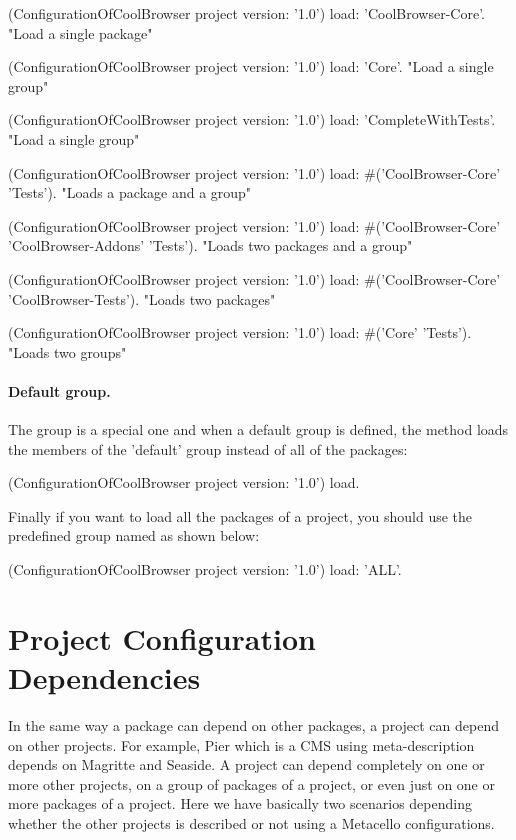 \documentclass[a4paper,10pt,twoside]{book}
\begin{document}
 
\begin{code}{}
(ConfigurationOfCoolBrowser project version: '1.0') load: 'CoolBrowser-Core'. 
	"Load a single package"

(ConfigurationOfCoolBrowser project version: '1.0') load: 'Core'. 
	"Load a single group"

(ConfigurationOfCoolBrowser project version: '1.0') load: 'CompleteWithTests'.  
	"Load a single group"
 
(ConfigurationOfCoolBrowser project version: '1.0') 
	load: #('CoolBrowser-Core' 'Tests').    
	"Loads a package and a group"

(ConfigurationOfCoolBrowser project version: '1.0') load: #('CoolBrowser-Core' 'CoolBrowser-Addons' 'Tests'). 
	"Loads two packages and a group" 

 (ConfigurationOfCoolBrowser project version: '1.0') load: #('CoolBrowser-Core' 'CoolBrowser-Tests').
	"Loads two packages"
  
(ConfigurationOfCoolBrowser project version: '1.0') load: #('Core' 'Tests'). 
	"Loads two groups"
\end{code}


\paragraph{Default group.} The  group is a special one and when a default group is defined, the  method loads the members of the 'default' group instead of all of the packages:
    
\begin{code}{}
(ConfigurationOfCoolBrowser project version: '1.0') load.
\end{code}

Finally if you want to load all the packages of a project, you should use the predefined group named  as shown below: 

\begin{code}{}
(ConfigurationOfCoolBrowser project version: '1.0') load: 'ALL'.
\end{code}
 

\section{Project Configuration Dependencies}

In the same way a package can depend on other packages, a project can depend on other projects.  For example, Pier which is a CMS using meta-description depends on Magritte and Seaside.  A project can depend completely on one or more other projects, on a group of packages of a project, or even just on one or more packages of a project. Here we have basically two scenarios depending whether the other projects is described or not using a Metacello configurations. 
\end{document}
